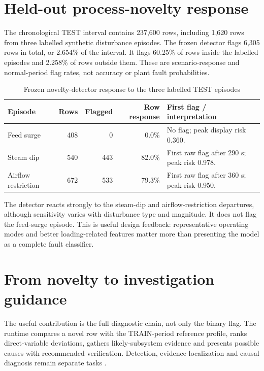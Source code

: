 \section{Held-out process-novelty response}

The chronological TEST interval contains 237,600 rows, including 1,620 rows from three labelled synthetic disturbance episodes. The frozen detector flags 6,305 rows in total, or 2.654\% of the interval. It flags 60.25\% of rows inside the labelled episodes and 2.258\% of rows outside them. These are scenario-response and normal-period flag rates, not accuracy or plant fault probabilities.

\begin{table}[htbp]
\centering\small
\caption{Frozen novelty-detector response to the three labelled TEST episodes}
\label{tab:scenario-response}
\begin{tabularx}{\textwidth}{@{}lrrrY@{}}
\toprule
Episode & Rows & Flagged & Row response & First flag / interpretation \\
\midrule
Feed surge & 408 & 0 & 0.0\% & No flag; peak display risk 0.360. \\
Steam dip & 540 & 443 & 82.0\% & First raw flag after 290 s; peak risk 0.978. \\
Airflow restriction & 672 & 533 & 79.3\% & First raw flag after 360 s; peak risk 0.950. \\
\bottomrule
\end{tabularx}
\end{table}

The detector reacts strongly to the steam-dip and airflow-restriction departures, although sensitivity varies with disturbance type and magnitude. It does not flag the feed-surge episode. This is useful design feedback: representative operating modes and better loading-related features matter more than presenting the model as a complete fault classifier.

\section{From novelty to investigation guidance}

The useful contribution is the full diagnostic chain, not only the binary flag. The runtime compares a novel row with the TRAIN-period reference profile, ranks direct-variable deviations, gathers likely-subsystem evidence and presents possible causes with recommended verification. Detection, evidence localization and causal diagnosis remain separate tasks \cite{venkatasubramanian2003}.

